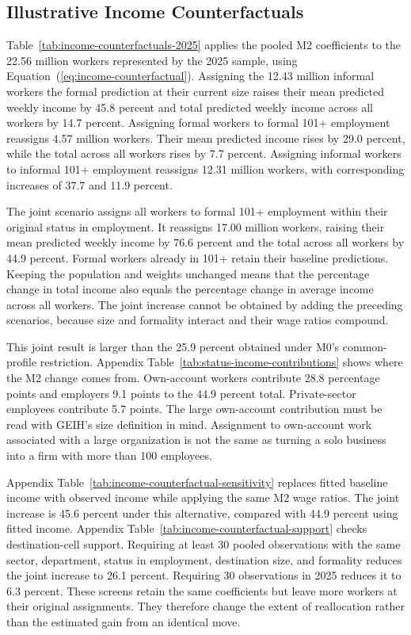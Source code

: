 \subsection{Illustrative Income Counterfactuals}
\label{subsec:income-counterfactuals}

Table~\ref{tab:income-counterfactuals-2025} applies the pooled M2 coefficients
to the 22.56 million workers represented by the 2025 sample, using
Equation~(\ref{eq:income-counterfactual}). Assigning the 12.43 million
informal workers the formal prediction at their current size raises their
mean predicted weekly income by 45.8 percent and total predicted weekly
income across all workers by 14.7 percent. Assigning formal workers to
formal 101+ employment reassigns 4.57 million workers. Their mean predicted
income rises by 29.0 percent, while the total across all workers rises by
7.7 percent. Assigning informal workers to informal 101+ employment reassigns
12.31 million workers, with corresponding increases of 37.7 and 11.9 percent.



The joint scenario assigns all workers to formal 101+ employment within
their original status in employment. It reassigns 17.00 million workers,
raising their mean predicted weekly income by 76.6 percent and the total
across all workers by 44.9 percent. Formal workers already in 101+ retain
their baseline predictions. Keeping the population and weights unchanged
means that the percentage change in total income also equals the percentage
change in average income across all workers. The joint increase cannot be
obtained by adding the preceding scenarios, because size and formality
interact and their wage ratios compound.

This joint result is larger than the 25.9 percent obtained under M0's
common-profile restriction. Appendix Table~\ref{tab:status-income-contributions}
shows where the M2 change comes from. Own-account workers contribute
28.8 percentage points and employers 9.1 points to the 44.9 percent total.
Private-sector employees contribute 5.7 points. The large own-account
contribution must be read with GEIH's size definition in mind. Assignment
to own-account work associated with a large organization is not the same
as turning a solo business into a firm with more than 100 employees.

Appendix Table~\ref{tab:income-counterfactual-sensitivity} replaces fitted
baseline income with observed income while applying the same M2 wage ratios.
The joint increase is 45.6 percent under this alternative, compared with
44.9 percent using fitted income. Appendix
Table~\ref{tab:income-counterfactual-support} checks destination-cell support.
Requiring at least 30 pooled observations with the same sector, department,
status in employment, destination size, and formality reduces the joint
increase to 26.1 percent. Requiring 30 observations in 2025 reduces it to
6.3 percent. These screens retain the same coefficients but leave more
workers at their original assignments. They therefore change the extent
of reallocation rather than the estimated gain from an identical move.
\FloatBarrier
